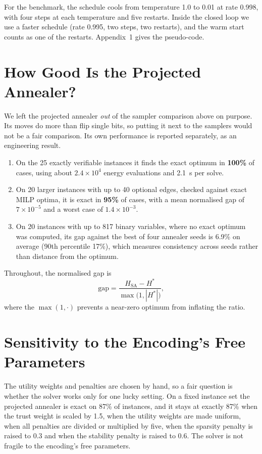 For the benchmark, the schedule cools from temperature 1.0 to 0.01 at rate
0.998, with four steps at each temperature and five restarts. Inside the
closed loop we use a faster schedule (rate 0.995, two steps, two restarts), and
the warm start counts as one of the restarts. Appendix~1 gives the
pseudo-code.

\section{How Good Is the Projected Annealer?}

We left the projected annealer \emph{out} of the sampler comparison above on
purpose. Its moves do more than flip single bits, so putting it next to the
samplers would not be a fair comparison. Its own performance is reported
separately, as an engineering result.

\begin{enumerate}[label=\arabic*.]
\item On the 25 exactly verifiable instances it finds the exact optimum in
\textbf{100\%} of cases, using about $2.4\times10^{4}$ energy evaluations and
2.1~s per solve.
\item On 20 larger instances with up to 40 optional edges, checked against
exact MILP optima, it is exact in \textbf{95\%} of cases, with a mean
normalised gap of $7\times10^{-5}$ and a worst case of $1.4\times10^{-3}$.
\item On 20 instances with up to 817 binary variables, where no exact optimum
was computed, its gap against the best of four annealer seeds is 6.9\% on
average (90th percentile 17\%), which measures consistency across seeds
rather than distance from the optimum.
\end{enumerate}

Throughout, the normalised gap is
\begin{equation}
\mathrm{gap}=\frac{H_{\mathrm{SA}}-H^{*}}{\max\bigl(1,|H^{*}|\bigr)},
\label{eq:sol:gap}
\end{equation}
where the $\max(1,\cdot)$ prevents a near-zero optimum from inflating the
ratio.

\section{Sensitivity to the Encoding's Free Parameters}

The utility weights and penalties are chosen by hand, so a fair question is
whether the solver works only for one lucky setting. On a fixed instance set
the projected annealer is exact on 87\% of instances, and it stays at exactly
87\% when the trust weight is scaled by 1.5, when the utility weights are made
uniform, when all penalties are divided or multiplied by five, when the
sparsity penalty is raised to 0.3 and when the stability penalty is raised to
0.6. The solver is not fragile to the encoding's free parameters.

